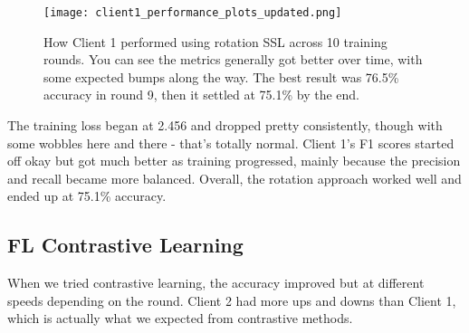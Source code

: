 \documentclass[a4paper, 10 pt, conference]{ieeeconf}
\begin{document}
\begin{figure*}[!htbp]
\centering
\texttt{[image: client1\_performance\_plots\_updated.png]}
\caption{How Client 1 performed using rotation SSL across 10 training rounds. You can see the metrics generally got better over time, with some expected bumps along the way. The best result was 76.5\% accuracy in round 9, then it settled at 75.1\% by the end.}
\label{fig:client1_performance}
\end{figure*}

The training loss began at 2.456 and dropped pretty consistently, though with some wobbles here and there - that's totally normal. Client 1's F1 scores started off okay but got much better as training progressed, mainly because the precision and recall became more balanced. Overall, the rotation approach worked well and ended up at 75.1\% accuracy.

\subsection{FL Contrastive Learning}

When we tried contrastive learning, the accuracy improved but at different speeds depending on the round. Client 2 had more ups and downs than Client 1, which is actually what we expected from contrastive methods.
\end{document}
